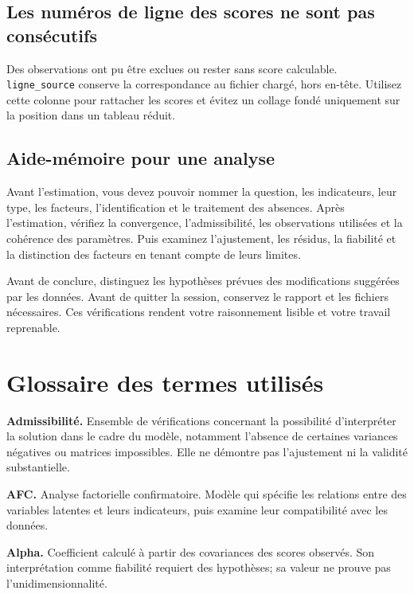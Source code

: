 \documentclass[
  french,
  11pt,
  a4paper,
  DIV=11,
  numbers=noendperiod]{scrreprt}
\begin{document}
\section{Les numéros de ligne des scores ne sont pas
consécutifs}\label{les-numuxe9ros-de-ligne-des-scores-ne-sont-pas-consuxe9cutifs}

Des observations ont pu être exclues ou rester sans score calculable.
\texttt{ligne\_source} conserve la correspondance au fichier chargé,
hors en-tête. Utilisez cette colonne pour rattacher les scores et évitez
un collage fondé uniquement sur la position dans un tableau réduit.

\section{Aide-mémoire pour une
analyse}\label{aide-muxe9moire-pour-une-analyse}

Avant l'estimation, vous devez pouvoir nommer la question, les
indicateurs, leur type, les facteurs, l'identification et le traitement
des absences. Après l'estimation, vérifiez la convergence,
l'admissibilité, les observations utilisées et la cohérence des
paramètres. Puis examinez l'ajustement, les résidus, la fiabilité et la
distinction des facteurs en tenant compte de leurs limites.

Avant de conclure, distinguez les hypothèses prévues des modifications
suggérées par les données. Avant de quitter la session, conservez le
rapport et les fichiers nécessaires. Ces vérifications rendent votre
raisonnement lisible et votre travail reprenable.

\chapter{Glossaire des termes utilisés}\label{sec-glossaire}

\textbf{Admissibilité.} Ensemble de vérifications concernant la
possibilité d'interpréter la solution dans le cadre du modèle, notamment
l'absence de certaines variances négatives ou matrices impossibles. Elle
ne démontre pas l'ajustement ni la validité substantielle.

\textbf{AFC.} Analyse factorielle confirmatoire. Modèle qui spécifie les
relations entre des variables latentes et leurs indicateurs, puis
examine leur compatibilité avec les données.

\textbf{Alpha.} Coefficient calculé à partir des covariances des scores
observés. Son interprétation comme fiabilité requiert des hypothèses; sa
valeur ne prouve pas l'unidimensionnalité.
\end{document}
